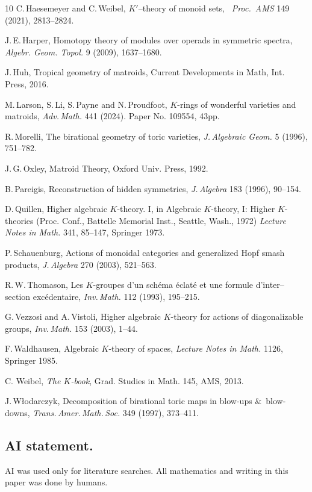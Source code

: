 \documentclass[12pt]{amsart}
\numberwithin{equation}{section}
\theoremstyle{plain}
\theoremstyle{definition}
\theoremstyle{remark}
\begin{document}
\begin{thebibliography}{10}
C.\,Haesemeyer and C.\,Weibel,
$K'$--theory of monoid sets,
{\it\ Proc.\ AMS} 149 (2021), 2813--2824.

J.\,E.\,Harper,
Homotopy theory of modules over operads in symmetric spectra,
{\it Algebr. Geom. Topol.} 9 (2009), 1637--1680.

J.\,Huh,
Tropical geometry of matroids,
Current Developments in Math, Int. Press, 2016.

M.\,Larson, S.\,Li, S.\,Payne and N.\,Proudfoot,
$K$-rings of wonderful varieties and matroids,
 {\it Adv.\,Math.} 441 (2024). Paper No. 109554, 43pp.  
 
 R.\,Morelli,
 The birational geometry of toric varieties,
 {\it J.\,Algebraic Geom.} 5 (1996), 751--782.

J.\,G.\,Oxley,
Matroid Theory,
Oxford Univ. Press, 1992.

B.\,Pareigis,
Reconstruction of hidden symmetries,
{\it J.\,Algebra} 183 (1996), 90--154.

D.\,Quillen,
Higher algebraic {$K$}-theory. {I},
in Algebraic {$K$}-theory, {I}: {H}igher {$K$}-theories ({P}roc.
{C}onf., {B}attelle {M}emorial {I}nst., {S}eattle, {W}ash.,
1972)
{\it Lecture Notes in Math.} 341, 85--147,
Springer 1973.

P.\,Schauenburg,
Actions of monoidal categories and generalized {H}opf smash
products,
{\it J.\,Algebra} 270 (2003), 521--563.


R.\,W.\,Thomason,
Les {$K$}-groupes d'un sch\'ema \'eclat\'e et une formule
d'inter--section exc\'edentaire,
{\it Inv.\,Math.} 112 (1993), 195--215.

G.\,Vezzosi and A.\,Vistoli,
Higher algebraic {$K$}-theory for actions of diagonalizable
groups,
{\it Inv.\,Math.} 153 (2003), 1--44.


F.\,Waldhausen,
Algebraic {$K$}-theory of spaces,
{\it Lecture Notes in Math.} 1126,
Springer 1985.

C. Weibel,
{\it The $K$-book}, 
Grad. Studies in Math. 145, AMS, 2013.

J.\,W\l{}odarczyk,
Decomposition of birational toric maps in blow-ups \&\
blow-downs,
{\it Trans.\,Amer.\,Math.\,Soc.} 349 (1997), 373--411.

\end{thebibliography}

\subsection*{AI statement.} AI was used only for literature searches. 
 All mathematics and writing in this paper was done by humans.
\end{document}
